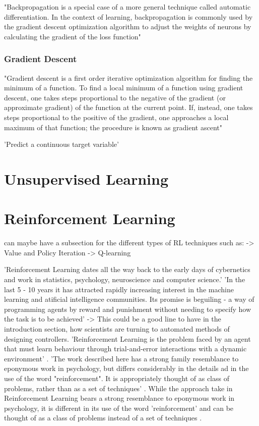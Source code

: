 "Backpropagation is a special case of a more general technique called automatic differentiation. In the context of learning, backpropagation is commonly used by the gradient descent optimization algorithm to adjust the weights of neurons by calculating the gradient of the loss function"

\subsubsection{Gradient Descent}


"Gradient descent is a first order iterative optimization algorithm for finding the minimum of a function. To find a local minimum of a function using gradient descent, one takes steps proportional to the negative of the gradient (or approximate gradient) of the function at the current point. If, instead, one takes steps proportional to the positive of the gradient, one approaches a local maximum of that function; the procedure is known as gradient ascent"

'Predict a continuous target variable'

\section{Unsupervised Learning}


\section{Reinforcement Learning}

can maybe have a subsection for the different types of RL techniques such as:
-> Value and Policy Iteration
-> Q-learning


'Reinforcement Learning dates all the way back to the early days of cybernetics and work in statistics, psychology, neuroscience and computer science.'\cite{KaelblingLittmanMoore1996}
'In the last 5 - 10 years it has attracted rapidly increasing interest in the machine learning and atificial intelligence communities. Its promise is beguiling - a way of programming agents by reward and punishment without needing to specify how the task is to be achieved' \cite{KaelblingLittmanMoore1996}
-> This could be a good line to have in the introduction section, how scientists are turning to automated methods of designing controllers.
'Reinforcement Learning is the problem faced by an agent that must learn behaviour through trial-and-error interactions with a dynamic environment' \cite{KaelblingLittmanMoore1996}.
'The work described here has a strong family resemblance to eponymous work in psychology, but differs considerably in the details ad in the use of the word "reinforcement". It is appropriately thought of as  class of problems, rather than as a set of techniques' \cite{KaelblingLittmanMoore1996}.
While the approach take in Reinforcement Learning bears a strong resemblance to eponymous work in psychology, it is different in its use of the word 'reinforcement' and can be thought of as a class of problems instead of a set of techniques \cite{KaelblingLittmanMoore1996}.

